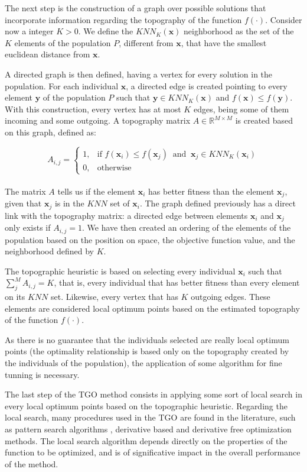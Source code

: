 The next step is the construction of a graph over possible solutions that incorporate information regarding the topography of the function $f(\cdot)$. Consider now a integer $K > 0$. We define the $KNN_K(\bm{x})$ neighborhood as the set of the $K$ elements of the population $P$, different from $\bm{x}$, that have the smallest euclidean distance from $\bm{x}$.

A directed graph is then defined, having a vertex for every solution in the population. For each individual $\bm{x}$, a directed edge is created pointing to every element $\bm{y}$ of the population $P$ such that $\bm{y} \in KNN_K(\bm{x})$ and $f(\bm{x}) \leq f(\bm{y})$. With this construction, every vertex has at most $K$ edges, being some of them incoming and some outgoing. A topography matrix $A \in \mathbb{R}^{M \times M}$ is created based on this graph, defined as:


\[
    A_{i, j} = 
\begin{cases}
    1,& \text{if } f(\bm{x}_i) \leq f(\bm{x}_j) \ \text{ and } \ \bm{x}_j \in KNN_K(\bm{x}_i) \\
    0,& \text{otherwise}
\end{cases}
\]
\\[-1.5em]


The matrix $A$ tells us if the element $\bm{x}_i$ has better fitness than the element $\bm{x}_j$, given that $\bm{x}_j$ is in the $KNN$ set of $\bm{x}_i$. The graph defined previously has a direct link with the topography matrix: a directed edge between elements $\bm{x}_i$ and $\bm{x}_j$ only exists if $A_{i, j} = 1$. We have then created an ordering of the elements of the population based on the position on space, the objective function value, and the neighborhood defined by $K$.

The topographic heuristic is based on selecting every individual $\bm{x}_i$ such that $\sum_j^M A_{i, j} = K$, that is, every individual that has better fitness than every element on its $KNN$ set. Likewise, every vertex that has $K$ outgoing edges. These elements are considered local optimum points based on the estimated topography of the function $f(\cdot)$.

As there is no guarantee that the individuals selected are really local optimum points (the optimality relationship is based only on the topography created by the individuals of the population), the application of 
some algorithm for fine tunning is necessary.

The last step of the TGO method consists in applying some sort of local search in every local optimum points based on the topographic heuristic. Regarding the local search, many procedures used in the TGO are found in the literature, such as pattern search algorithms \citep{ITGO2}, derivative based \citep{ITGO3} and derivative free \citep{ITGO4} optimization methods. The local search algorithm depends directly on the properties of the function to be optimized, and is of significative impact in the overall performance of the method.

